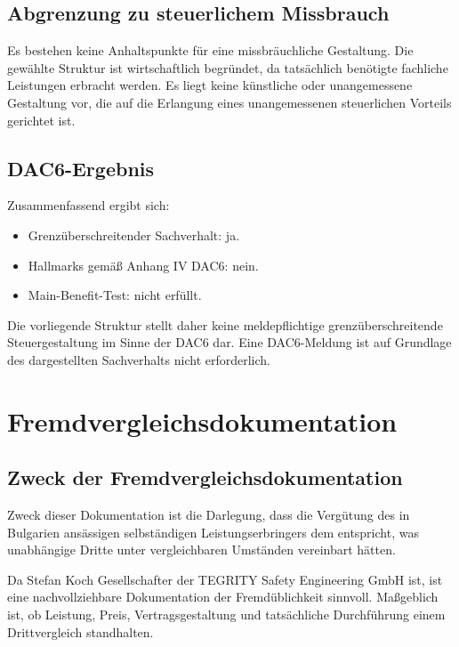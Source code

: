 \documentclass[11pt,a4paper]{article}
\begin{document}
\subsection{Abgrenzung zu steuerlichem Missbrauch}

Es bestehen keine Anhaltspunkte für eine missbräuchliche Gestaltung. Die gewählte Struktur ist wirtschaftlich begründet, da tatsächlich benötigte fachliche Leistungen erbracht werden. Es liegt keine künstliche oder unangemessene Gestaltung vor, die auf die Erlangung eines unangemessenen steuerlichen Vorteils gerichtet ist.

\subsection{DAC6-Ergebnis}

Zusammenfassend ergibt sich:

\begin{itemize}
    \item Grenzüberschreitender Sachverhalt: ja.
    \item Hallmarks gemäß Anhang IV DAC6: nein.
    \item Main-Benefit-Test: nicht erfüllt.
\end{itemize}

Die vorliegende Struktur stellt daher keine meldepflichtige grenzüberschreitende Steuergestaltung im Sinne der DAC6 dar. Eine DAC6-Meldung ist auf Grundlage des dargestellten Sachverhalts nicht erforderlich.

\section{Fremdvergleichsdokumentation}

\subsection{Zweck der Fremdvergleichsdokumentation}

Zweck dieser Dokumentation ist die Darlegung, dass die Vergütung des in Bulgarien ansässigen selbständigen Leistungserbringers dem entspricht, was unabhängige Dritte unter vergleichbaren Umständen vereinbart hätten.

Da Stefan Koch Gesellschafter der TEGRITY Safety Engineering GmbH ist, ist eine nachvollziehbare Dokumentation der Fremdüblichkeit sinnvoll. Maßgeblich ist, ob Leistung, Preis, Vertragsgestaltung und tatsächliche Durchführung einem Drittvergleich standhalten.
\end{document}
